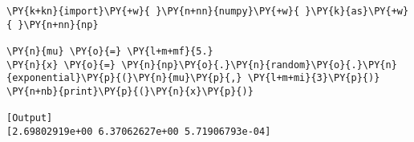 \begin{Verbatim}[label=\makebox{\href{https://github.com/unipi-physics-labs/lab1-notes/tree/main/snippy/np.random.exponential.py}{https://github.com/.../np.random.exponential.py}},commandchars=\\\{\}]
\PY{k+kn}{import}\PY{+w}{ }\PY{n+nn}{numpy}\PY{+w}{ }\PY{k}{as}\PY{+w}{ }\PY{n+nn}{np}

\PY{n}{mu} \PY{o}{=} \PY{l+m+mf}{5.}
\PY{n}{x} \PY{o}{=} \PY{n}{np}\PY{o}{.}\PY{n}{random}\PY{o}{.}\PY{n}{exponential}\PY{p}{(}\PY{n}{mu}\PY{p}{,} \PY{l+m+mi}{3}\PY{p}{)}
\PY{n+nb}{print}\PY{p}{(}\PY{n}{x}\PY{p}{)}

[Output]
[2.69802919e+00 6.37062627e+00 5.71906793e-04]
\end{Verbatim}

